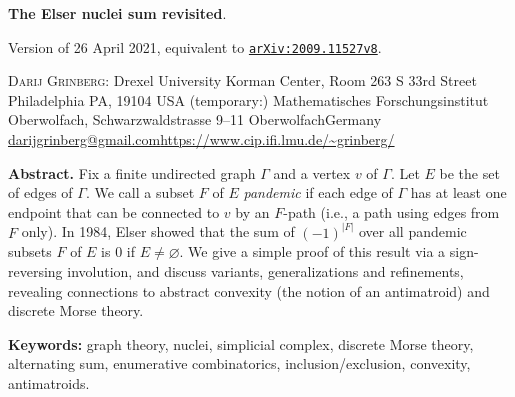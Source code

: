 \documentclass[numbers=enddot,12pt,final,onecolumn]{scrartcl}%
\theoremstyle{definition}
\newcommand\horiline{\noindent\makebox[\linewidth]{\rule{\textwidth}{1pt}} \newline}
\begin{document}
\setcounter{page}{2}

\horiline


\textbf{The Elser nuclei sum revisited}.

\bigskip

Version of 26 April 2021, \newline\phantom{u} \qquad equivalent to
\href{http://www.arxiv.org/abs/2009.11527v8}{\texttt{arXiv:2009.11527v8}}.

\bigskip

\textsc{Darij Grinberg}: \newline\phantom{u}\qquad Drexel University
\newline\phantom{u}\qquad Korman Center, Room 263 \newline\phantom{u}
S 33rd Street \newline\phantom{u}\qquad Philadelphia PA, 19104 \newline%
\phantom{u}\qquad USA \newline\phantom{u}\qquad(temporary:) \newline%
\phantom{u}\qquad Mathematisches Forschungsinstitut Oberwolfach,\newline%
\phantom{u}\qquad Schwarzwaldstrasse 9--11\newline\phantom{u}
Oberwolfach\newline\phantom{u}\qquad Germany \newline\phantom{u}\qquad
\url{darijgrinberg@gmail.com}\newline\phantom{u}\qquad\url{https://www.cip.ifi.lmu.de/~grinberg/}

\bigskip\textbf{Abstract.} Fix a finite undirected graph $\Gamma$ and a vertex
$v$ of $\Gamma$. Let $E$ be the set of edges of $\Gamma$. We call a subset $F$
of $E$ \textit{pandemic} if each edge of $\Gamma$ has at least one endpoint
that can be connected to $v$ by an $F$-path (i.e., a path using edges from $F$
only). In 1984, Elser showed that the sum of $\left(  -1\right)  ^{\left\vert
F\right\vert }$ over all pandemic subsets $F$ of $E$ is $0$ if $E\neq
\varnothing$. We give a simple proof of this result via a sign-reversing
involution, and discuss variants, generalizations and refinements, revealing
connections to abstract convexity (the notion of an antimatroid) and discrete
Morse theory.

\bigskip\textbf{Keywords:} graph theory, nuclei, simplicial complex, discrete
Morse theory, alternating sum, enumerative combinatorics, inclusion/exclusion,
convexity, antimatroids. \vspace{1.0038pc}
\end{document}
